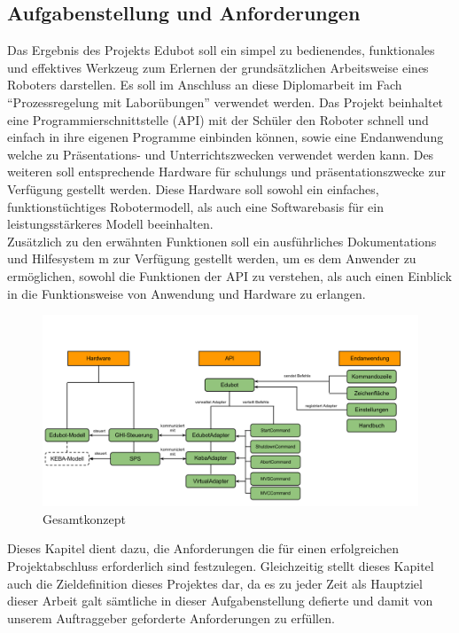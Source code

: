 \subsection{Aufgabenstellung und Anforderungen}
Das Ergebnis des Projekts Edubot soll ein simpel zu bedienendes, funktionales und effektives Werkzeug zum Erlernen der grundsätzlichen Arbeitsweise eines Roboters darstellen. Es soll im Anschluss an diese Diplomarbeit im Fach “Prozessregelung mit Laborübungen” verwendet werden. Das Projekt beinhaltet eine Programmierschnittstelle (API) mit der  Schüler den Roboter schnell und einfach in ihre eigenen Programme einbinden können, sowie eine Endanwendung welche zu Präsentations- und Unterrichtszwecken verwendet werden kann.
Des weiteren soll entsprechende Hardware für schulungs und präsentationszwecke zur Verfügung gestellt werden. Diese Hardware soll sowohl ein einfaches, funktionstüchtiges Robotermodell, als auch eine Softwarebasis für ein leistungsstärkeres Modell beeinhalten.
\\[0.5em]
Zusätzlich zu den erwähnten Funktionen soll ein ausführliches Dokumentations und Hilfesystem m zur Verfügung gestellt werden, um es dem Anwender zu ermöglichen, sowohl die Funktionen der API zu verstehen, als auch einen Einblick in die Funktionsweise von Anwendung und Hardware zu erlangen.
\begin{figure}[H]
  \centering
  \begin{minipage}[t]{14 cm}
  	\centering
  	\includegraphics[width=14cm]{images/EdubotSystem} 
    \caption{Gesamtkonzept}
  \end{minipage}
\end{figure}
Dieses Kapitel dient dazu, die Anforderungen die für einen erfolgreichen Projektabschluss erforderlich sind festzulegen. Gleichzeitig stellt dieses Kapitel auch die Zieldefinition dieses Projektes dar, da es zu jeder Zeit als Hauptziel dieser Arbeit galt sämtliche in dieser Aufgabenstellung defierte und damit von unserem Auftraggeber geforderte Anforderungen zu erfüllen.

